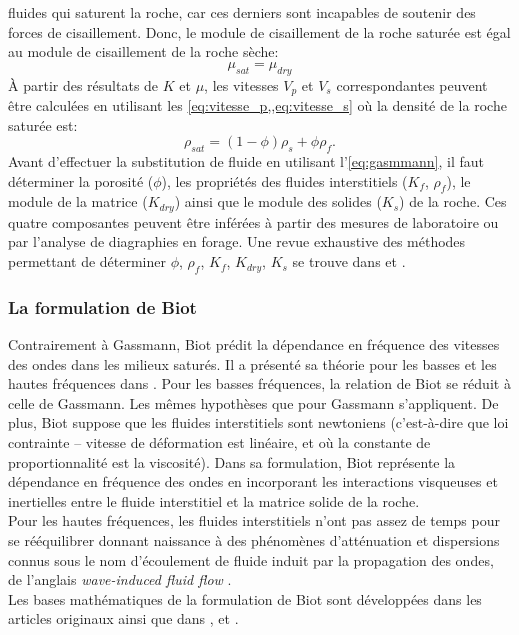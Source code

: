fluides qui saturent la roche, car ces derniers sont incapables de soutenir des
forces de cisaillement. Donc, le module de cisaillement de la roche saturée est
égal au module de cisaillement de la roche sèche:
\begin{equation}
\mu_{sat} = \mu_{dry}
\end{equation}
À partir des résultats de $K$ et $\mu$, les vitesses $V_p$ et $V_s$
correspondantes peuvent être calculées en utilisant les
\cref{eq:vitesse_p,,eq:vitesse_s} où la densité de la roche saturée est:
\begin{equation}
\rho_{sat} = (1-\phi)\rho_s + \phi \rho_f.
\end{equation}
Avant d'effectuer la substitution de fluide en utilisant l'\cref{eq:gasmmann},
il faut déterminer la porosité ($\phi$), les propriétés des fluides
interstitiels ($K_f$, $\rho_f$), le module de la matrice ($K_{dry}$) ainsi que le
module des solides ($K_s$) de la roche. Ces quatre composantes peuvent être
inférées à partir des mesures de laboratoire ou par l'analyse de diagraphies en forage. Une
revue exhaustive des méthodes permettant de déterminer $\phi$, $\rho_f$, $K_f$, $K_{dry}$, $K_s$ se trouve dans
\citet{Smith2003} et \citet{Mavko2009}.
\subsubsection{La formulation de Biot}
Contrairement à Gassmann, Biot prédit la dépendance en fréquence des vitesses
des ondes dans les milieux saturés. Il a présenté sa théorie pour les basses et
les hautes fréquences dans \citet{Biot1956a,Biot1956b}. Pour les basses
fréquences, la relation de Biot se réduit à celle de Gassmann. Les mêmes
hypothèses que pour Gassmann s'appliquent. De plus, Biot suppose que les fluides
interstitiels sont newtoniens (c'est-à-dire que loi contrainte – vitesse de déformation est linéaire, et où la constante de proportionnalité est la viscosité). Dans sa formulation, Biot représente la
dépendance en fréquence des ondes en incorporant les interactions visqueuses et
inertielles entre le fluide interstitiel et la matrice solide de la roche. \\
Pour les hautes fréquences, les fluides interstitiels n'ont pas assez de temps
pour se rééquilibrer donnant naissance à des phénomènes d’atténuation et
dispersions connus sous le nom d'écoulement de fluide induit par la propagation
des ondes, de l'anglais \emph{wave-induced fluid flow} \citep{Muller2010}.\\
Les bases mathématiques de la formulation de Biot sont développées dans les
articles originaux \citet{Biot1956a,Biot1956b} ainsi que dans
\citet{Bourbie1986}, \citet{Carcione2007} et \citet{Allard2009}.
